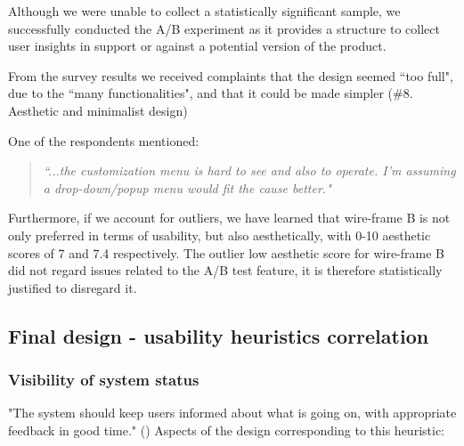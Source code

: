 \documentclass{article}
\begin{document}
Although we were unable to collect a statistically significant sample, we successfully conducted the A/B experiment as it provides a structure to
collect user insights in support or against a potential version of the product. \parencite{Young2014}

From the survey results we received complaints that the design seemed ``too full", due to the ``many functionalities", and that it could be made simpler (\#8. Aesthetic and minimalist design)

One of the respondents mentioned:

\begin{quotation}
\emph{``...the customization menu is hard to see and also to operate.
I'm assuming a drop-down/popup menu would fit the cause better."}
\end{quotation}

Furthermore, if we account for outliers, we have learned that wire-frame B is not only preferred in terms of usability, but also aesthetically,
with 0-10 aesthetic scores of 7 and 7.4 respectively. The outlier low aesthetic score for wire-frame B did not regard issues related
to the A/B test feature, it is therefore statistically justified to disregard it. 

\subsection{Final design - usability heuristics correlation\label{usabilityheuristics}}

\subsubsection{Visibility of system status\label{1stheuristic}}
"The system should keep users informed about what is going on, with appropriate feedback in good time."
(\textcite{Nielsen1994})
Aspects of the design corresponding to this heuristic:
\end{document}
